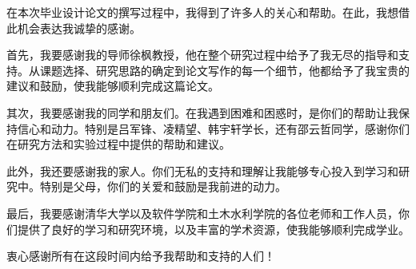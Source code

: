 
\begin{acknowledgements}
  在本次毕业设计论文的撰写过程中，我得到了许多人的关心和帮助。在此，我想借此机会表达我诚挚的感谢。

  首先，我要感谢我的导师徐枫教授，他在整个研究过程中给予了我无尽的指导和支持。从课题选择、研究思路的确定到论文写作的每一个细节，他都给予了我宝贵的建议和鼓励，使我能够顺利完成这篇论文。

  其次，我要感谢我的同学和朋友们。在我遇到困难和困惑时，是你们的帮助让我保持信心和动力。特别是吕军锋、凌精望、韩宇轩学长，还有邵云哲同学，感谢你们在研究方法和实验过程中提供的帮助和建议。

  此外，我还要感谢我的家人。你们无私的支持和理解让我能够专心投入到学习和研究中。特别是父母，你们的关爱和鼓励是我前进的动力。

  最后，我要感谢清华大学以及软件学院和土木水利学院的各位老师和工作人员，你们提供了良好的学习和研究环境，以及丰富的学术资源，使我能够顺利完成学业。

  衷心感谢所有在这段时间内给予我帮助和支持的人们！
\end{acknowledgements}
